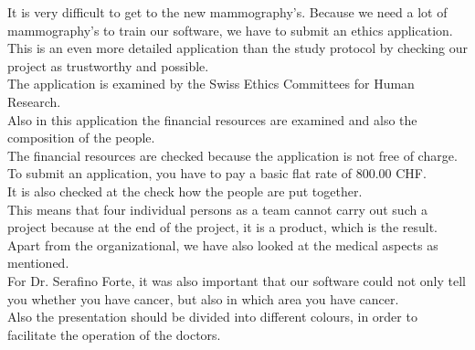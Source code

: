 It is very difficult to get to the new mammography’s. Because we need a lot of mammography’s to train our software, we have to submit an ethics application. \\
This is an even more detailed application than the study protocol by checking our project as trustworthy and possible. \\
The application is examined by the Swiss Ethics Committees for Human Research. \\
Also in this application the financial resources are examined and also the composition of the people. \\
The financial resources are checked because the application is not free of charge. \\
To submit an application, you have to pay a basic flat rate of 800.00 CHF. \\
It is also checked at the check how the people are put together. \\
This means that four individual persons as a team cannot carry out such a project because at the end of the project, it is a product, which is the result. \\
Apart from the organizational, we have also looked at the medical aspects as mentioned. \\
For Dr. Serafino Forte, it was also important that our software could not only tell you whether you have cancer, but also in which area you have cancer. \\
Also the presentation should be divided into different colours, in order to facilitate the operation of the doctors. 
